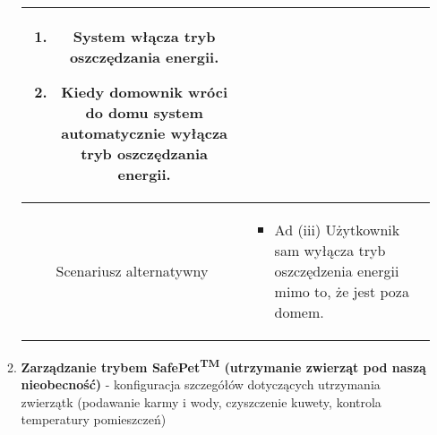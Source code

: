 \documentclass{article}
\begin{document}
\begin{enumerate}
\begin{enumerate}
\begin{table}[H]
\begin{tabular}{|c|p{7cm}|}
\begin{enumerate}
\item System włącza tryb oszczędzania energii.

\item Kiedy domownik wróci do domu system automatycznie wyłącza tryb oszczędzania energii.\end{enumerate} \\
						\hline
						Scenariusz alternatywny & \begin{itemize}\item Ad (iii) Użytkownik sam wyłącza tryb oszczędzenia energii mimo to, że jest poza domem.\end{itemize}                                                                                                                                               \\
						\hline
					\end{tabular}
				\end{table}

			\item \textbf{Zarządzanie trybem SafePet\textsuperscript{TM} (utrzymanie zwierząt
				pod naszą nieobecność)} - konfiguracja szczegółów dotyczących utrzymania
				zwierzątk (podawanie karmy i wody, czyszczenie kuwety, kontrola temperatury
				pomieszczeń)


\end{enumerate}
\end{enumerate}
\end{document}
